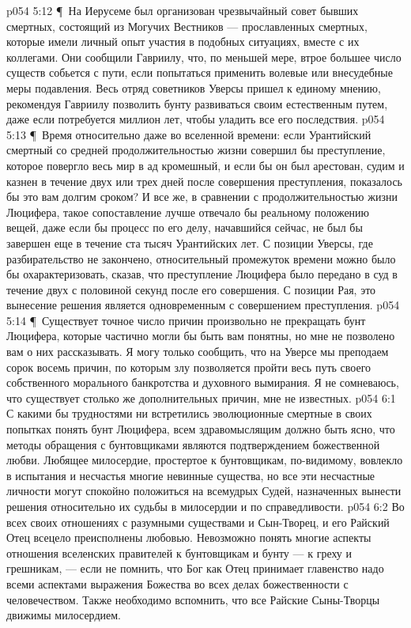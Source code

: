 \vs p054 5:12 \P\ \bibnobreakspace На Иерусеме был организован чрезвычайный совет бывших смертных, состоящий из Могучих Вестников --- прославленных смертных, которые имели личный опыт участия в подобных ситуациях, вместе с их коллегами. Они сообщили Гавриилу, что, по меньшей мере, втрое большее число существ собьется с пути, если попытаться применить волевые или внесудебные меры подавления. Весь отряд советников Уверсы пришел к единому мнению, рекомендуя Гавриилу позволить бунту развиваться своим естественным путем, даже если потребуется миллион лет, чтобы уладить все его последствия.
\vs p054 5:13 \P\ \bibnobreakspace Время относительно даже во вселенной времени: если Урантийский смертный со средней продолжительностью жизни совершил бы преступление, которое повергло весь мир в ад кромешный, и если бы он был арестован, судим и казнен в течение двух или трех дней после совершения преступления, показалось бы это вам долгим сроком? И все же, в сравнении с продолжительностью жизни Люцифера, такое сопоставление лучше отвечало бы реальному положению вещей, даже если бы процесс по его делу, начавшийся сейчас, не был бы завершен еще в течение ста тысяч Урантийских лет. С позиции Уверсы, где разбирательство не закончено, относительный промежуток времени можно было бы охарактеризовать, сказав, что преступление Люцифера было передано в суд в течение двух с половиной секунд после его совершения. С позиции Рая, это вынесение решения является одновременным с совершением преступления.
\vs p054 5:14 \P\ Существует точное число причин произвольно не прекращать бунт Люцифера, которые частично могли бы быть вам понятны, но мне не позволено вам о них рассказывать. Я могу только сообщить, что на Уверсе мы преподаем сорок восемь причин, по которым злу позволяется пройти весь путь своего собственного морального банкротства и духовного вымирания. Я не сомневаюсь, что существует столько же дополнительных причин, мне не известных.
\vs p054 6:1 С какими бы трудностями ни встретились эволюционные смертные в своих попытках понять бунт Люцифера, всем здравомыслящим должно быть ясно, что методы обращения с бунтовщиками являются подтверждением божественной любви. Любящее милосердие, простертое к бунтовщикам, по\hyp{}видимому, вовлекло в испытания и несчастья многие невинные существа, но все эти несчастные личности могут спокойно положиться на всемудрых Судей, назначенных вынести решения относительно их судьбы в милосердии и по справедливости.
\vs p054 6:2 Во всех своих отношениях с разумными существами и Сын\hyp{}Творец, и его Райский Отец всецело преисполнены любовью. Невозможно понять многие аспекты отношения вселенских правителей к бунтовщикам и бунту --- к греху и грешникам, --- если не помнить, что Бог как Отец принимает главенство надо всеми аспектами выражения Божества во всех делах божественности с человечеством. Также необходимо вспомнить, что все Райские Сыны\hyp{}Творцы движимы милосердием.
